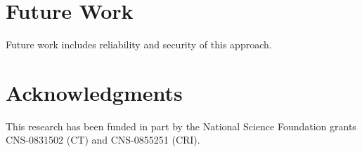 \documentclass{IEEEtran}
\begin{document}
\section{Future Work}
Future work includes reliability and security of this approach.


%



\small {\section*{Acknowledgments}

This research has been funded in part by the National Science
Foundation grants CNS-0831502 (CT) and CNS-0855251 (CRI).}

\small{


}
\end{document}
